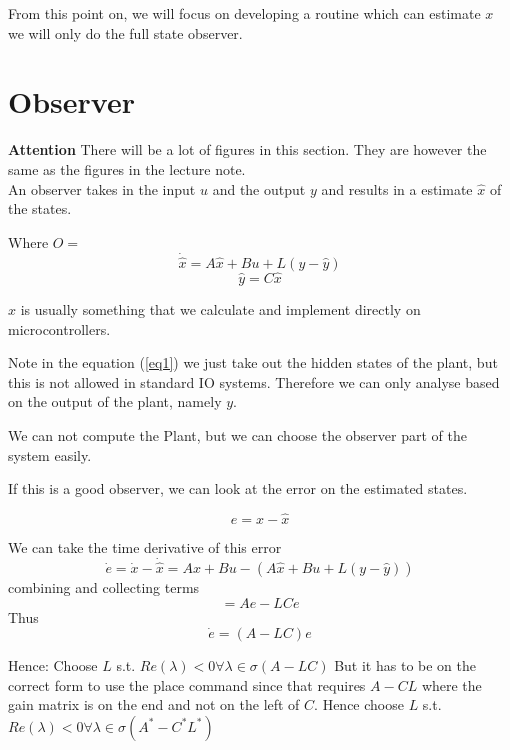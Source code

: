 \documentclass[a4paper]{article}
\begin{document}
From this point on, we will focus on developing a routine which can estimate $ x $
we will only do the full state observer.

\section{Observer}
\textbf{Attention} There will be a lot of figures in this section. They are however the same as the figures in the lecture note. \\
An observer takes in the input $ u $ and the output $ y $ and results in a estimate $ \hat{x} $ of the states. 

Where $ O = $
\begin{equation}
\dot{\hat{x}} = A \hat{x} + Bu + L(y-\hat{y})
\end{equation}
\begin{equation}
\hat{y} = C \hat{x}
\end{equation}

$ \hat{x} $ is usually something that we calculate and implement directly on microcontrollers.

Note in the equation (\ref{eq1}) we just take out the hidden states of the plant, but this is not allowed in standard IO systems. Therefore we can only analyse based on the output of the plant, namely $ y $.

We can not compute the Plant, but we can choose the observer part of the system easily. 

If this is a good observer, we can look at the error on the estimated states. 

\begin{equation}
e = x - \hat{x}
\end{equation}

We can take the time derivative of this error 
\begin{equation}
	\dot{e} = \dot{x} - \dot{\hat{x}} = Ax + Bu - (A \hat{x} + B u + L(y- \hat{y}))
\end{equation}
combining and collecting terms
\begin{equation}
 = A e - L C e 
\end{equation}
Thus 
\begin{equation}
\dot{e} = (A-L C)e
\end{equation}

\begin{framed}
	Hence: Choose $ L $ s.t.  $ Re(\lambda) < 0  \forall \lambda \in \sigma(A-LC) $ But it has to be on the correct form to use the place command since that requires $ A - C L $ where the gain matrix is on the end and not on the left of  $ C $. Hence choose $ L $ s.t. $ Re(\lambda) < 0  \forall \lambda \in \sigma(A^{*} - C^{*} L^{*} )$
\end{framed} 
\end{document}
